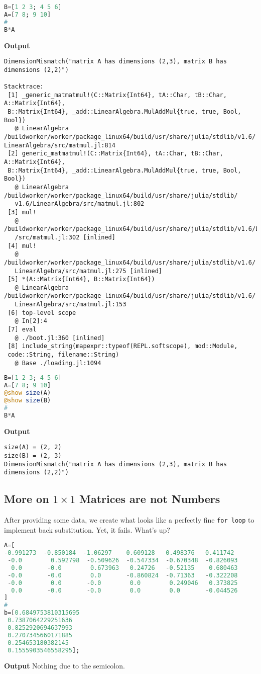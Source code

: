 \begin{lstlisting}[language=Julia,style=mystyle]
B=[1 2 3; 4 5 6]
A=[7 8; 9 10]
#
B*A
\end{lstlisting}
\textbf{Output} 
\begin{verbatim}
DimensionMismatch("matrix A has dimensions (2,3), matrix B has dimensions (2,2)")

Stacktrace:
 [1] _generic_matmatmul!(C::Matrix{Int64}, tA::Char, tB::Char, A::Matrix{Int64},
 B::Matrix{Int64}, _add::LinearAlgebra.MulAddMul{true, true, Bool, Bool})
   @ LinearAlgebra 
/buildworker/worker/package_linux64/build/usr/share/julia/stdlib/v1.6/
LinearAlgebra/src/matmul.jl:814
 [2] generic_matmatmul!(C::Matrix{Int64}, tA::Char, tB::Char, A::Matrix{Int64}, 
 B::Matrix{Int64}, _add::LinearAlgebra.MulAddMul{true, true, Bool, Bool})
   @ LinearAlgebra /buildworker/worker/package_linux64/build/usr/share/julia/stdlib/
   v1.6/LinearAlgebra/src/matmul.jl:802
 [3] mul!
   @ /buildworker/worker/package_linux64/build/usr/share/julia/stdlib/v1.6/LinearAlgebra
   /src/matmul.jl:302 [inlined]
 [4] mul!
   @ /buildworker/worker/package_linux64/build/usr/share/julia/stdlib/v1.6/
   LinearAlgebra/src/matmul.jl:275 [inlined]
 [5] *(A::Matrix{Int64}, B::Matrix{Int64})
   @ LinearAlgebra /buildworker/worker/package_linux64/build/usr/share/julia/stdlib/v1.6/
   LinearAlgebra/src/matmul.jl:153
 [6] top-level scope
   @ In[2]:4
 [7] eval
   @ ./boot.jl:360 [inlined]
 [8] include_string(mapexpr::typeof(REPL.softscope), mod::Module, 
 code::String, filename::String)
   @ Base ./loading.jl:1094
\end{verbatim}


\begin{lstlisting}[language=Julia,style=mystyle]
B=[1 2 3; 4 5 6]
A=[7 8; 9 10]
@show size(A)
@show size(B)
#
B*A
\end{lstlisting}
\textbf{Output} 
\begin{verbatim}
size(A) = (2, 2)
size(B) = (2, 3)
DimensionMismatch("matrix A has dimensions (2,3), matrix B has dimensions (2,2)")
\end{verbatim}


\subsection{More on $1 \times 1$ Matrices are not Numbers}

After providing some data, we create what looks like a perfectly fine \texttt{for\,loop} to implement back substitution. Yet, it fails. What's up? 
\begin{lstlisting}[language=Julia,style=mystyle]
A=[
-0.991273  -0.850184  -1.06297    0.609128   0.498376   0.411742
 -0.0        0.592798  -0.509626  -0.547334  -0.670348  -0.826093
  0.0       -0.0        0.673963   0.24726   -0.52135    0.680463
 -0.0       -0.0        0.0       -0.860824  -0.71363   -0.322208
 -0.0        0.0       -0.0        0.0        0.249046   0.373825
  0.0       -0.0       -0.0        0.0        0.0       -0.044526
]
#
b=[0.6849753810315695
 0.7387064229251636
 0.8252920694637993
 0.2707345660171885
 0.254653180382145
 0.1555903546558295];
\end{lstlisting}
\textbf{Output} 
Nothing due to the semicolon. 


